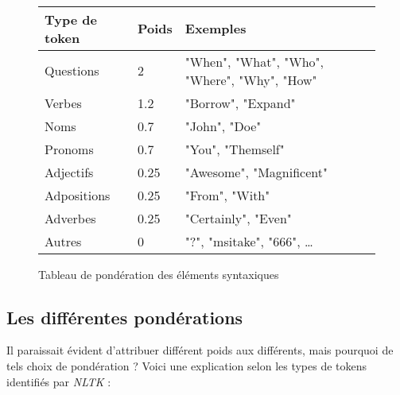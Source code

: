 \ 
\newline
\begin{figure}[h]
\begin{center}
\begin{tabular}{lll}
Type de token & Poids & Exemples \\
\hline
Questions & 2 & "When", "What", "Who", "Where", "Why", "How"\\
Verbes & 1.2 & "Borrow", "Expand" \\
Noms & 0.7 & "John", "Doe" \\
Pronoms & 0.7 & "You", "Themself" \\
Adjectifs & 0.25 & "Awesome", "Magnificent" \\ 
Adpositions & 0.25 & "From", "With" \\
Adverbes & 0.25 & "Certainly", "Even" \\
Autres & 0 & "?", "msitake", "666", \dots \\
\end{tabular}
\caption{Tableau de pondération des éléments syntaxiques}
\label{ponderationTab}
\end{center}
\end{figure}

\subsection{Les différentes pondérations}

Il paraissait évident d'attribuer différent poids aux différents, mais pourquoi de tels choix de pondération ? Voici une explication selon les types de tokens identifiés par \textit{NLTK} : \newline

